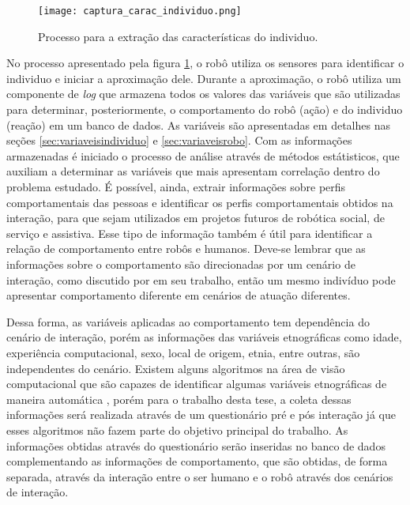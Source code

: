 \begin{figure}[ht!]
	\centering
	\begin{minipage}{0.8\textwidth}
		\caption{Processo para a extração das características do individuo.}
		\texttt{[image: captura\_carac\_individuo.png]}
		\label{fig:capturacaracteristicas}
	\end{minipage}
\end{figure}

No processo apresentado pela figura \ref{fig:capturacaracteristicas}, o robô utiliza os sensores para identificar o individuo e iniciar a aproximação dele. Durante a aproximação, o robô utiliza um componente de \emph{log} que armazena todos os valores das variáveis que são utilizadas para determinar, posteriormente, o comportamento do robô (ação) e do individuo (reação) em um banco de dados. As variáveis são apresentadas em detalhes nas seções \ref{sec:variaveisindividuo} e \ref{sec:variaveisrobo}. Com as informações armazenadas é iniciado o processo de análise através de métodos estátisticos, que auxiliam a determinar as variáveis que mais apresentam correlação dentro do problema estudado. É possível, ainda, extrair informações sobre perfis comportamentais das pessoas e identificar  os perfis comportamentais obtidos na interação, para que sejam utilizados em projetos futuros de robótica social, de serviço e assistiva. Esse tipo de informação também é útil para identificar a relação de comportamento entre robôs e humanos. Deve-se lembrar que as informações sobre o comportamento são direcionadas por um cenário de interação, como discutido por  em seu trabalho, então um mesmo indivíduo pode apresentar comportamento diferente em cenários de atuação diferentes.

Dessa forma, as variáveis aplicadas ao comportamento tem dependência do cenário de interação, porém as informações das variáveis etnográficas como idade, experiência computacional, sexo, local de origem, etnia, entre outras, são independentes do cenário. Existem alguns algoritmos na área de visão computacional que são capazes de identificar algumas variáveis etnográficas de maneira automática \cite{yang:2007, shan:2012, ylioinas:2012, samadi:2013, amaral:2014}, porém para o trabalho desta tese, a coleta dessas informações será realizada através de um questionário pré e pós interação já que esses algoritmos não fazem parte do objetivo principal do trabalho. As informações obtidas através do questionário serão inseridas no banco de dados complementando as informações de comportamento, que são obtidas, de forma separada, através da interação entre o ser humano e o robô através dos cenários de interação.

